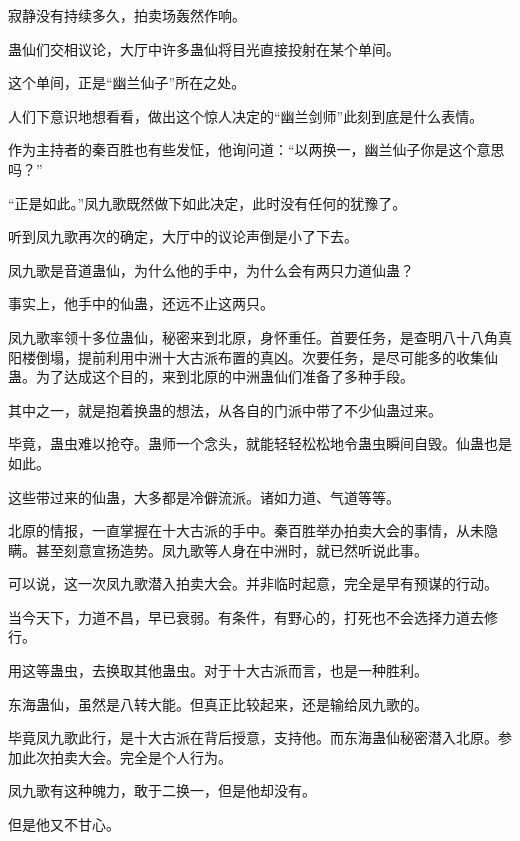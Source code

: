 
\begin{this_body}



寂静没有持续多久，拍卖场轰然作响。

蛊仙们交相议论，大厅中许多蛊仙将目光直接投射在某个单间。

这个单间，正是“幽兰仙子”所在之处。

人们下意识地想看看，做出这个惊人决定的“幽兰剑师”此刻到底是什么表情。

作为主持者的秦百胜也有些发怔，他询问道：“以两换一，幽兰仙子你是这个意思吗？”

“正是如此。”凤九歌既然做下如此决定，此时没有任何的犹豫了。

听到凤九歌再次的确定，大厅中的议论声倒是小了下去。

凤九歌是音道蛊仙，为什么他的手中，为什么会有两只力道仙蛊？

事实上，他手中的仙蛊，还远不止这两只。

凤九歌率领十多位蛊仙，秘密来到北原，身怀重任。首要任务，是查明八十八角真阳楼倒塌，提前利用中洲十大古派布置的真凶。次要任务，是尽可能多的收集仙蛊。为了达成这个目的，来到北原的中洲蛊仙们准备了多种手段。

其中之一，就是抱着换蛊的想法，从各自的门派中带了不少仙蛊过来。

毕竟，蛊虫难以抢夺。蛊师一个念头，就能轻轻松松地令蛊虫瞬间自毁。仙蛊也是如此。

这些带过来的仙蛊，大多都是冷僻流派。诸如力道、气道等等。

北原的情报，一直掌握在十大古派的手中。秦百胜举办拍卖大会的事情，从未隐瞒。甚至刻意宣扬造势。凤九歌等人身在中洲时，就已然听说此事。

可以说，这一次凤九歌潜入拍卖大会。并非临时起意，完全是早有预谋的行动。

当今天下，力道不昌，早已衰弱。有条件，有野心的，打死也不会选择力道去修行。

用这等蛊虫，去换取其他蛊虫。对于十大古派而言，也是一种胜利。

东海蛊仙，虽然是八转大能。但真正比较起来，还是输给凤九歌的。

毕竟凤九歌此行，是十大古派在背后授意，支持他。而东海蛊仙秘密潜入北原。参加此次拍卖大会。完全是个人行为。

凤九歌有这种魄力，敢于二换一，但是他却没有。

但是他又不甘心。


\end{this_body}
